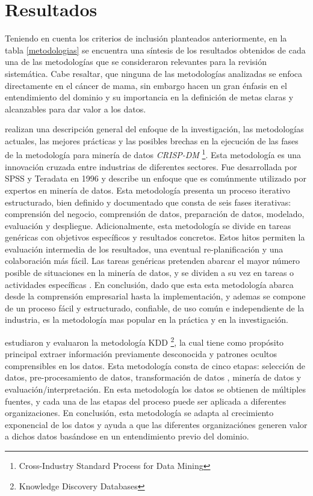 \section{Resultados}

Teniendo en cuenta los criterios de inclusión planteados anteriormente, en la tabla \ref{metodologias} se encuentra una síntesis de los resultados obtenidos de cada una de las  metodologías que se consideraron relevantes para la revisión sistemática. Cabe resaltar, que ninguna de las metodologías analizadas se enfoca directamente en el cáncer de mama, sin embargo hacen un gran énfasis en el entendimiento del dominio y su importancia en la definición de metas claras y alcanzables para dar valor a los datos. 

\citep{Schroer2021} realizan una descripción general del enfoque de la investigación, las metodologías actuales, las mejores prácticas y las posibles brechas en la ejecución de las fases de la metodología para minería de datos \textit{CRISP-DM} \footnote{Cross-Industry Standard Process for Data Mining }. Esta metodología es una innovación cruzada entre industrias de diferentes sectores. Fue desarrollada por SPSS y Teradata en 1996 y describe un enfoque  que es comúnmente utilizado por expertos en minería de datos. Esta metodología presenta un proceso iterativo estructurado, bien definido y documentado que consta de seis fases iterativas: comprensión del negocio, comprensión de datos, preparación de datos, modelado, evaluación y despliegue. Adicionalmente, esta metodología se divide en tareas genéricas con objetivos específicos y resultados concretos. Estos hitos permiten la evaluación intermedia de los resultados, una eventual re-planificación y una colaboración más fácil. Las tareas genéricas pretenden abarcar el mayor número posible de situaciones en la minería de datos, y se dividen a su vez en tareas o actividades específicas \citep{Mladenic2012}. En conclusión, dado que esta esta metodología abarca desde la comprensión empresarial hasta la implementación, y ademas se compone de un proceso fácil y estructurado, confiable, de uso común e independiente de la industria, es la metodología mas popular en la práctica y en la investigación.

\cite{Safhi2019} estudiaron y evaluaron la metodología KDD \footnote{Knowledge Discovery Databases}, la cual tiene como propósito principal  extraer información previamente desconocida y patrones ocultos comprensibles en los datos. Esta metodología consta de cinco etapas: selección de datos,  pre-procesamiento de datos, transformación de datos , minería de datos y evaluación/interpretación. En esta metodología los datos se obtienen de múltiples fuentes, y cada una de las etapas del proceso puede ser aplicada a diferentes organizaciones. En conclusión, esta metodología se adapta al crecimiento exponencial de los datos y ayuda a que las diferentes organizaciónes generen valor a dichos datos basándose en un entendimiento previo del dominio.

